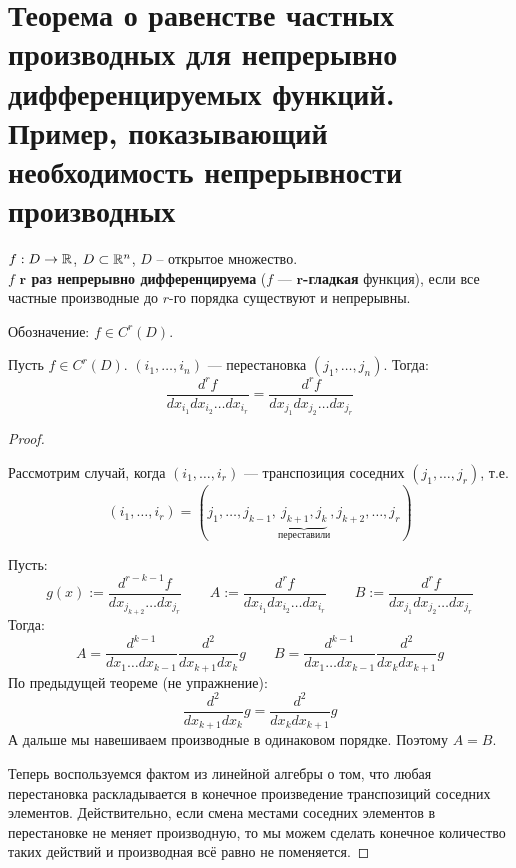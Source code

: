 \section{Теорема о равенстве частных производных для непрерывно дифференцируемых функций. Пример, показывающий необходимость непрерывности производных }

\begin{conj}
    $f : D \to \mathbb{R}$, $D \subset \mathbb{R}^n$, $D$ -- открытое множество. \\
    $f$ \textbf{$\mathbf{r}$ раз непрерывно дифференцируема} 
    ($f$ --- \textbf{$\mathbf{r}$-гладкая} функция), если 
    все частные производные до $r$-го порядка существуют и
    непрерывны.

    Обозначение: $f \in C^r(D)$.
\end{conj}

\begin{theorem}
    Пусть $f \in C^r(D)$. $(i_1, \dots, i_n)$ --- перестановка 
    $(j_1, \dots, j_n)$. Тогда:
    $$ \frac{d^r f}{d x_{i_1} d x_{i_2} \dots d x_{i_r}} = 
    \frac{d^r f}{d x_{j_1} d x_{j_2} \dots d x_{j_r}} $$
\end{theorem}
\begin{proof} $ $

    Рассмотрим случай, когда $(i_1, \dots, i_r)$ --- транспозиция
    соседних $(j_1, \dots, j_r)$, т.е. 
    $$(i_1, \dots, i_r) = (j_1, \dots, j_{k - 1}, 
    \underbrace{j_{k + 1}, j_k}_{\text{переставили}}, 
    j_{k + 2}, \dots, j_r)$$

    Пусть:
    $$ g(x) := \frac{d^{r - k - 1} f}{d x_{j_{k + 2}} \dots d x_{j_r}}
    \quad \quad
    A := \frac{d^r f}{d x_{i_1} d x_{i_2} \dots d x_{i_r}} \quad
    \quad B := \frac{d^r f}{d x_{j_1} d x_{j_2} \dots d x_{j_r}} $$
    Тогда:
    $$ A = \frac{d^{k-1}}{d x_1 \dots d x_{k-1}} 
    \frac{d^{2}}{d x_{k+1} d x_{k}} g \quad \quad 
    B = \frac{d^{k-1}}{d x_1 \dots d x_{k-1}} 
    \frac{d^{2}}{d x_{k} d x_{k+1}} g$$
    По предыдущей теореме (не упражнение):
    $$ \frac{d^{2}}{d x_{k+1} d x_{k}} g = 
    \frac{d^{2}}{d x_{k} d x_{k+1}} g $$
    А дальше мы навешиваем производные в одинаковом порядке.
    Поэтому $A = B$.

    Теперь воспользуемся фактом из линейной алгебры о том, что любая
    перестановка раскладывается в конечное произведение транспозиций
    соседних элементов. Действительно, если смена местами соседних
    элементов в перестановке не меняет производную, 
    то мы можем сделать конечное
    количество таких действий и производная всё равно не поменяется.
\end{proof}